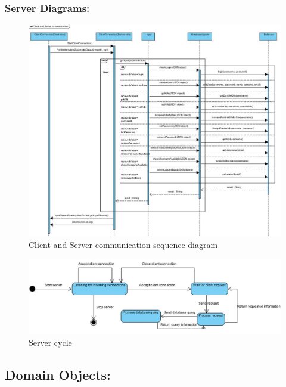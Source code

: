 \documentclass[letterpaper]{article}
\begin{document}
				\subsubsection*{Server Diagrams:}
				\vspace{0.1in}
				
					\begin{figure}[H]
					\centering
					\includegraphics[width=180mm]{UML_Diagram/Sequence/Client_Server_Sequence_Diagram.jpg}
					\caption{Client and Server communication sequence diagram}
					\label{overflow}
					\end{figure}
			
					\begin{figure}[H]
					\centering
					\includegraphics[width=180mm]{UML_Diagram/State/Server_State_Diagram.jpg}
					\caption{Server cycle}
					\label{overflow}
					\end{figure}
			
			\vspace{0.2in}
			\subsection*{Domain Objects:}
			\vspace{0.1in}
			
\end{document}
